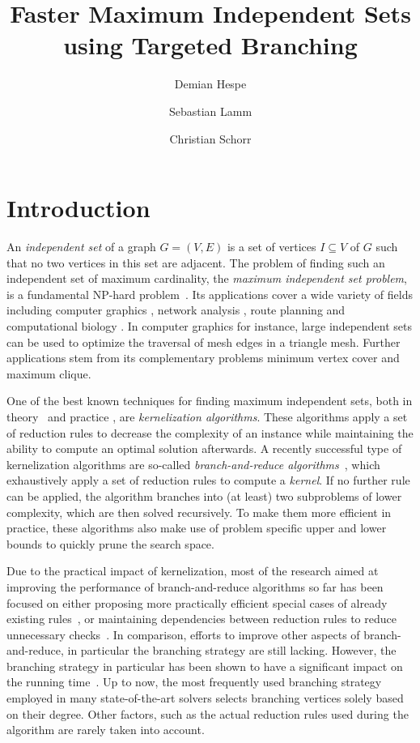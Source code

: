 \documentclass[a4paper,UKenglish,cleveref, autoref, thm-restate]{lipics-v2021}
\title{Faster Maximum Independent Sets using Targeted Branching} %
\author{Demian Hespe}{Karlsruhe Institute of Technology, Institute for
  Theoretical Informatics, Germany}{hespe@kit.edu}{}{}
\author{Sebastian Lamm}{Karlsruhe Institute of Technology, Institute for
  Theoretical Informatics, Germany}{lamm@kit.edu}{}{\todo{Add funding}}
\author{Christian Schorr}{Karlsruhe Institute of Technology, Institute for
  Theoretical Informatics, Germany}{christian.schorr@student.kit.edu}{}{}
\begin{document}
\maketitle

\begin{abstract}
\end{abstract}

\newpage

\section{Introduction}

An \emph{independent set} of a graph $G = (V,E)$ is a set of vertices $I \subseteq V$ of $G$ such that no two vertices in this set are adjacent.
The problem of finding such an independent set of maximum cardinality, the \emph{maximum independent set problem}, is a fundamental NP-hard problem~\cite{Garey1974}.
Its applications cover a wide variety of fields including computer graphics \cite{CG}, network analysis \cite{NW}, route planning \cite{RP} and computational biology \cite{BIO1, BIO2}.
In computer graphics for instance, large independent sets can be used to optimize the traversal of mesh edges in a triangle mesh.
Further applications stem from its complementary problems minimum vertex cover and maximum clique.

One of the best known techniques for finding maximum independent sets, both in theory~\cite{XiaoNagamochi, ChenXiaKanj} and practice \cite{AkibaIwata}, are \emph{kernelization algorithms}.
These algorithms apply a set of reduction rules to decrease the complexity of an instance while maintaining the ability to compute an optimal solution afterwards.
A recently successful type of kernelization algorithms are so-called \emph{branch-and-reduce algorithms}~\cite{AkibaIwata,WGYC}, which exhaustively apply a set of reduction rules to compute a \emph{kernel}.
If no further rule can be applied, the algorithm branches into (at least) two subproblems of lower complexity, which are then solved recursively.
To make them more efficient in practice, these algorithms also make use of problem specific upper and lower bounds to quickly prune the search space.

Due to the practical impact of kernelization, most of the research aimed at improving the performance of branch-and-reduce algorithms so far has been focused on either proposing more practically efficient special cases of already existing rules~\cite{ChangKern,dahlum2016accelerating}, or maintaining dependencies between reduction rules to reduce unnecessary checks~\cite{alsahafy2020computing,hespe2019scalable}.
In comparison, efforts to improve other aspects of branch-and-reduce, in particular the branching strategy are still lacking.
However, the branching strategy in particular has been shown to have a significant impact on the running time~\cite{AkibaIwata}.
Up to now, the most frequently used branching strategy employed in many state-of-the-art solvers selects branching vertices solely based on their degree.
Other factors, such as the actual reduction rules used during the algorithm are rarely taken into account.
\end{document}
